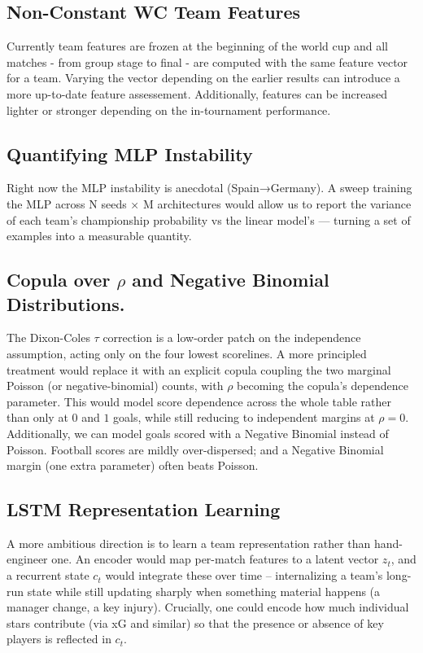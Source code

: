 \documentclass{article}
\begin{document}
\subsection{Non-Constant WC Team Features}
Currently team features are frozen at the beginning of the world cup and all matches - from group stage to final - are computed with the same feature vector for a team. 
Varying the vector depending on the earlier results can introduce a more up-to-date feature assessement. Additionally, features can be increased lighter or stronger depending on the in-tournament performance. 

\subsection{Quantifying MLP 
Instability}

Right now the MLP instability is anecdotal (Spain→Germany). A sweep training the MLP across N seeds × M
architectures would allow us to report the variance of each team's championship probability vs the linear model's — turning a set of examples into a measurable quantity.

\subsection{Copula over $\rho$ and Negative Binomial Distributions.}

The Dixon-Coles $\tau$ correction is a low-order patch on the independence assumption, acting only on the four lowest scorelines. A more principled treatment would replace it with an explicit copula coupling the two marginal Poisson (or negative-binomial) counts, with $\rho$ becoming the copula's dependence parameter. This would model score dependence across the whole table rather than only at $0$ and $1$ goals, while still reducing 
to independent margins at $\rho = 0$.
Additionally, we can model goals scored with a Negative Binomial instead of Poisson. Football scores are mildly over-dispersed; and a Negative Binomial margin (one extra parameter) often beats Poisson.

\subsection{LSTM Representation Learning}

A more ambitious direction is to learn a team representation rather than hand-engineer one. An encoder would map per-match features to a latent vector $z_t$, and a recurrent state $c_t$ would integrate these over time -- internalizing a team's long-run state while still updating sharply when something material happens (a manager change, a key injury). Crucially, one could encode how much individual stars contribute (via xG and similar) so that the presence or absence of key players is reflected in $c_t$.
\end{document}
